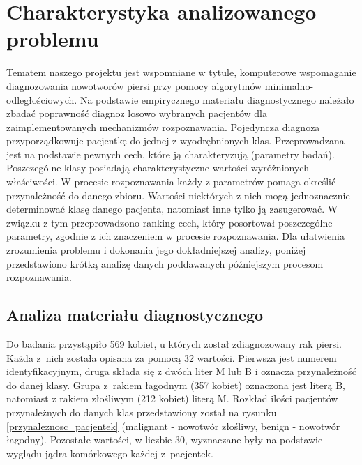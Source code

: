 \documentclass[12pt]{article}
\begin{document}
\section{Charakterystyka analizowanego problemu}
Tematem naszego projektu jest wspomniane w tytule, komputerowe wspomaganie diagnozowania nowotworów piersi przy pomocy algorytmów minimalno-odległościowych. Na podstawie empirycznego materiału diagnostycznego należało zbadać poprawność diagnoz losowo wybranych pacjentów dla zaimplementowanych mechanizmów rozpoznawania.
\newline
\indent Pojedyncza diagnoza przyporządkowuje pacjentkę do jednej z wyodrębnionych klas. Przeprowadzana jest na podstawie pewnych cech, które ją charakteryzują (parametry badań). Poszczególne klasy posiadają charakterystyczne wartości wyróżnionych właściwości. W procesie rozpoznawania każdy z parametrów pomaga określić przynależność do danego zbioru. Wartości niektórych z nich mogą jednoznacznie determinować klasę danego pacjenta, natomiast inne tylko ją zasugerować. W związku z tym przeprowadzono ranking cech, który posortował poszczególne parametry, zgodnie z ich znaczeniem w procesie rozpoznawania. 
\newline \indent Dla ułatwienia zrozumienia problemu i dokonania jego dokładniejszej analizy, poniżej przedstawiono krótką analizę danych poddawanych późniejszym procesom rozpoznawania.


\subsection{Analiza materiału diagnostycznego}
\indent Do badania przystąpiło 569 kobiet, u których został zdiagnozowany rak piersi. Każda z~nich została opisana za pomocą 32 wartości. Pierwsza jest numerem identyfikacyjnym, druga składa się z dwóch liter M lub B i oznacza przynależność do danej klasy.  Grupa z~rakiem łagodnym (357 kobiet) oznaczona jest literą B, natomiast z rakiem złośliwym (212 kobiet) literą M. Rozkład ilości pacjentów przynależnych do danych klas przedstawiony został na rysunku \ref{przynaleznosc_pacjentek} (malignant - nowotwór złośliwy, benign - nowotwór łagodny). Pozostałe wartości, w liczbie 30, wyznaczane były na podstawie wyglądu jądra komórkowego każdej z~pacjentek.
\newline
\end{document}
